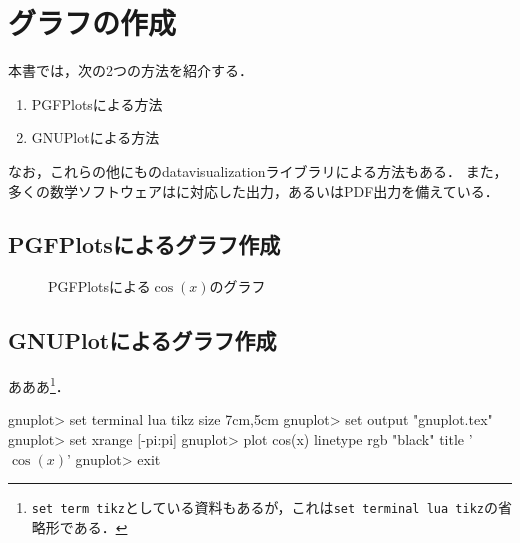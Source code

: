 \documentclass[../../index]{subfiles}
\begin{document}
\chapter{グラフの作成}
本書では，次の2つの方法を紹介する．
\begin{enumerate}
  \item PGFPlotsによる方法
  \item GNUPlotによる方法
\end{enumerate}

なお，これらの他にも\TikZ のdatavisualizationライブラリによる方法もある．
また，多くの数学ソフトウェアは\LaTeXe に対応した出力，あるいはPDF出力を備えている．

\section{PGFPlotsによるグラフ作成}
\begin{codeblock}
\end{codeblock}

\begin{figure}[htbp]
  \centering
  \caption{PGFPlotsによる\(\cos(x)\)のグラフ}
\end{figure}

\section{GNUPlotによるグラフ作成}
あああ\footnote{\texttt{set term tikz}としている資料もあるが，これは\texttt{set terminal lua tikz}の省略形である．}．

\begin{codeblock}
gnuplot> set terminal lua tikz size 7cm,5cm
gnuplot> set output "gnuplot.tex"
gnuplot> set xrange [-pi:pi]
gnuplot> plot cos(x) linetype rgb "black" title '$\cos(x)$'
gnuplot> exit
\end{codeblock}
\end{document}
